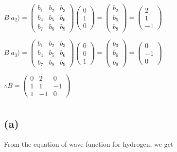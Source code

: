 \documentclass[12pt]{article}
\begin{document}
\begin{spacing}{2.0}
$B|a_2\rangle= \left(
\begin{array}{ccc}
b_1 & b_2 & b_3\\
b_4 & b_5 & b_6\\
b_7 & b_8 & b_9
\end{array}
\right)\left(
\begin{array}{c}
0\\
1\\
0
\end{array}\right)= \left(
\begin{array}{c}
b_2\\
b_5\\
b_8
\end{array}\right)= \left(
\begin{array}{c}
2\\
1\\
-1
\end{array}\right)$

$B|a_3\rangle= \left(
\begin{array}{ccc}
b_1 & b_2 & b_3\\
b_4 & b_5 & b_6\\
b_7 & b_8 & b_9
\end{array}
\right)\left(
\begin{array}{c}
0\\
0\\
1
\end{array}\right)= \left(
\begin{array}{c}
b_3\\
b_6\\
b_9
\end{array}\right)= \left(
\begin{array}{c}
0\\
-1\\
0
\end{array}\right)$

$\therefore B=\left(
\begin{array}{ccc}
0 & 2 & 0\\
1 & 1 & -1\\
1 & -1 & 0
\end{array}
\right)$

\section{} %
\subsection*{(a)}
From the equation of wave function for hydrogen, we get


\end{spacing}
\end{document}
